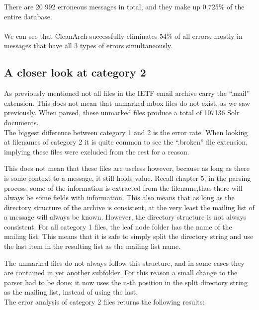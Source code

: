 \documentclass[a4paper,english]{report}
\begin{document}
There are 20 992 erroneous messages in total, and they make up 0.725\% of the entire database.\\\\
We can see that CleanArch successfully eliminates 54\% of all errors, mostly in messages that have all 3 types of errors simultaneously. 


\subsection{A closer look at category 2}

As previously mentioned not all files in the IETF email archive carry the “.mail” extension. This does not mean that unmarked mbox files do not exist, as we saw previously. 
When parsed, these unmarked files produce a total of 107136 Solr documents.\\

The biggest difference between category 1 and 2 is the error rate. When looking at filenames of category 2 it is quite common to see the “.broken” file extension, implying these files were excluded from the rest for a reason.

This does not mean that these files are useless however, because as long as there is some context to a message, it still holds value. Recall chapter 5, in the parsing process, some of the information is extracted from the filename,thus there will always be some fields with information.
This also means that as long as the directory structure of the archive is consistent, at the very least the mailing list of a message will always be known.
However, the directory structure is not always consistent. For all category 1 files, the leaf node folder has the name of the mailing list. This means that it is safe to simply split the directory string and use the last item in the resulting list as the mailing list name.

The unmarked files do not always follow this structure, and in some cases they are contained in yet another subfolder.
For this reason a small change to the parser had to be done; it now uses the n-th position in the split directory string as the mailing list, instead of using the last.\\

The error analysis of category 2 files returns the following results:\\\\
\noindent
\end{document}
